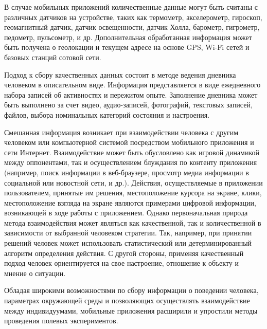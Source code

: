 В случае мобильных приложений количественные данные могут быть считаны с различных датчиков на устройстве, таких как термометр, акселерометр, гироскоп, геомагнитный датчик, датчик освещенности, датчик Холла, барометр, гигрометр, педометр, пульсометр, и др. Дополнительная обработанная информация может быть получена о геолокации и текущем адресе на основе GPS, Wi-Fi сетей и базовых станций сотовой сети.

Подход к сбору качественных данных состоит в методе ведения дневника человеком в описательном виде. Информация представляется в виде ежедневного набора записей об активностях и пережитом опыте. Заполнение дневника может быть выполнено за счет видео, аудио-записей, фотографий, текстовых записей, файлов, выбора номинальных категорий состояния и настроения.

Смешанная информация возникает при взаимодействии человека с другим человеком или компьютерной системой посредством мобильного приложения и сети Интернет. Взаимодействие может быть обусловлено как игровой динамикой между оппонентами, так и осуществлением блуждания по контенту приложения (например, поиск информации в веб-браузере, просмотр медиа информации в социальной или новостной сети, и др.). Действия, осуществляемые в приложении пользователем, принятые им решения, местоположение курсора на экране, клики, местоположение взгляда на экране являются примерами цифровой информации, возникающей в ходе работы с приложением. Однако первоначальная природа метода взаимодействия может являться как качественной, так и количественной в зависимости от выбранной человеком стратегии. Так, например, при принятии решений человек может использовать статистический или детерминированный алгоритм определения действия. С другой стороны, применяя качественный подход человек ориентируется на свое настроение, отношение к объекту и мнение о ситуации.

Обладая широкими возможностями по сбору информации о поведении человека, параметрах окружающей среды и позволяющих осуществлять взаимодействие между индивидуумами, мобильные приложения расширили и упростили методы проведения полевых экспериментов.





